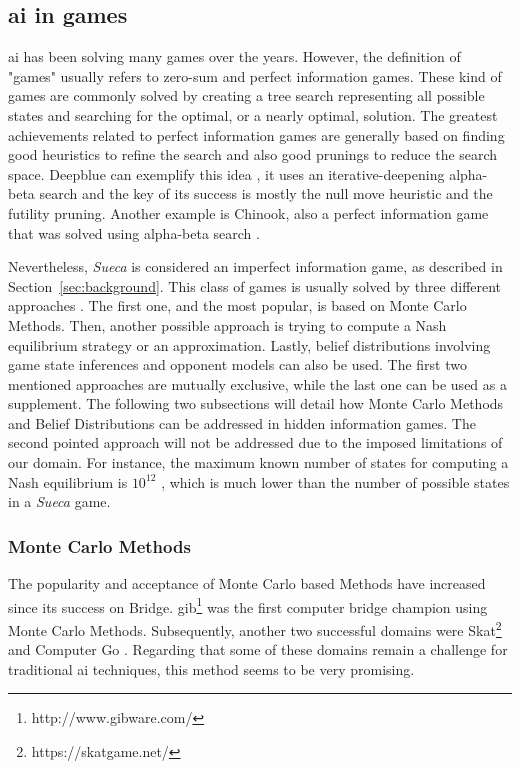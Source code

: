 \subsection{\gls{ai} in games}
 
\gls{ai} has been solving many games over the years.
However, the definition of "games" usually refers to zero-sum and perfect information games.
These kind of games are commonly solved by creating a tree search representing all possible states and searching for the optimal, or a nearly optimal, solution.
The greatest achievements related to perfect information games are generally based on finding good heuristics to refine the search and also good prunings to reduce the search space.
Deepblue can exemplify this idea \cite{Campbell2002}, it uses an iterative-deepening alpha-beta search and the key of its success is mostly the null move heuristic and the futility pruning.
Another example is Chinook, also a perfect information game that was solved using alpha-beta search \cite{Schaeffer1996}.

Nevertheless, \emph{Sueca} is considered an imperfect information game, as described in Section~\ref{sec:background}.
This class of games is usually solved by three different approaches \cite{Cowling2012}.
The first one, and the most popular, is based on Monte Carlo Methods.
Then, another possible approach is trying to compute a Nash equilibrium strategy or an approximation.
Lastly, belief distributions involving game state inferences and opponent models can also be used.
The first two mentioned approaches are mutually exclusive, while the last one can be used as a supplement.
The following two subsections will detail how Monte Carlo Methods and Belief Distributions can be addressed in hidden information games.
The second pointed approach will not be addressed due to the imposed limitations of our domain.
For instance, the maximum known number of states for computing a Nash equilibrium is $10^{12}$ \cite{Zinkevich}, which is much lower than the number of possible states in a \emph{Sueca} game.




\subsubsection{Monte Carlo Methods}

The popularity and acceptance of Monte Carlo based Methods have increased since its success on Bridge.
\gls{gib}\footnote{http://www.gibware.com/} was the first computer bridge champion using Monte Carlo Methods.
Subsequently, another two successful domains were Skat\footnote{https://skatgame.net/} and Computer Go \cite{Gelly2011}.
Regarding that some of these domains remain a challenge for traditional \gls{ai} techniques, this method seems to be very promising.



